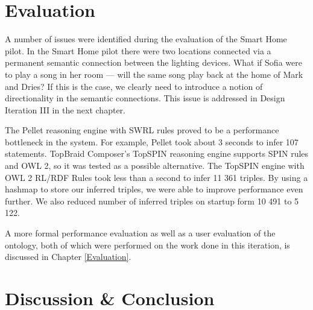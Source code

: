 \section{Evaluation}

A number of issues were identified during the evaluation of the Smart Home pilot. In the Smart Home pilot there were two locations connected via a permanent semantic connection between the lighting devices. What if Sofia were to play a song in her room --- will the same song play back at the home of Mark and Dries? If this is the case, we clearly need to introduce a notion of directionality in the semantic connections. This issue is addressed in Design Iteration III in the next chapter.

The Pellet reasoning engine with \ac{SWRL} rules proved to be a performance bottleneck in the system. For example, Pellet took about 3 seconds to infer 107 statements. TopBraid Composer's TopSPIN reasoning engine supports \ac{SPIN} rules and \ac{OWL} 2, so it was tested as a possible alternative. The TopSPIN engine with OWL 2 RL/RDF Rules took less than a second to infer 11 361 triples. By using a hashmap to store our inferred triples, we were able to improve performance even further. We also reduced number of inferred triples on startup form 10 491 to 5 122.

A more formal performance evaluation as well as a user evaluation of the ontology, both of which were performed on the work done in this iteration, is discussed in Chapter \ref{Evaluation}.

		
		
\section{Discussion \& Conclusion}


